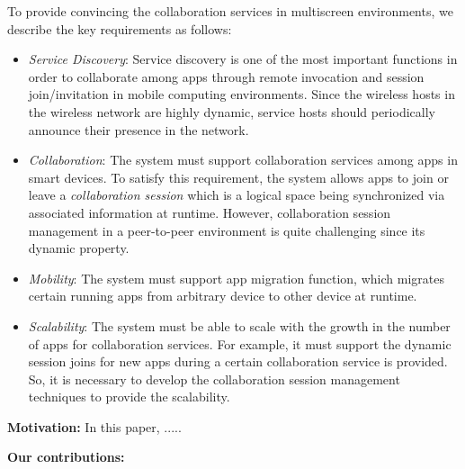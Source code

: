 \documentclass{sig-alternate}
\newcommand{\bi}{\begin{itemize}}
\newcommand{\ei}{\end{itemize}}
\newcommand{\ii}{\item}
\begin{document}
To provide convincing the collaboration services in multiscreen environments, we describe the key requirements 
as follows:
\bi
\ii \emph{Service Discovery}: 
Service discovery is one of the most important functions in order to collaborate among apps through remote invocation and session join/invitation in mobile computing environments.
Since the wireless hosts in the wireless network are highly dynamic,  service hosts should periodically announce their presence in the network.
\ii \emph{Collaboration}: 
The system must support  collaboration services among apps in smart devices. To satisfy this requirement, the system allows apps to join or leave a \textit{collaboration session} which is a logical space being synchronized via associated information at runtime.
However, collaboration session management in a peer-to-peer environment is quite challenging since its dynamic property. 
 \ii \emph{Mobility}: 
The system must support app migration function, which migrates certain running apps from arbitrary device to other device at runtime.
\ii \emph{Scalability}: 
The system must be able to scale with the growth in the number of apps for collaboration services. For example, it must support the dynamic session joins for new apps during a certain collaboration service is provided. So, it is necessary to develop the collaboration session management techniques to provide the scalability.
\ei

\noindent
\textbf{Motivation:} In this paper, .....

\noindent
\textbf{Our contributions:}


%
\end{document}
